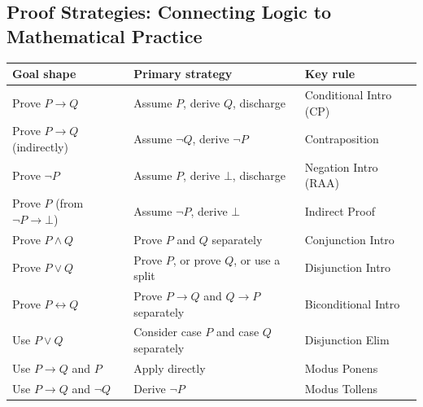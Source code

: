 
\subsection{Proof Strategies: Connecting Logic to Mathematical Practice}

\begin{tcolorbox}[colback=gray!6, colframe=gray!40, arc=2pt,
  left=6pt, right=6pt, top=4pt, bottom=4pt,
  title={\small\textbf{Proof Strategy Guide — Quick Reference}},
  fonttitle=\small\bfseries]
\small
\begin{tabular}{l l l}
\toprule
\textbf{Goal shape} & \textbf{Primary strategy} & \textbf{Key rule} \\
\midrule
Prove $P \to Q$              & Assume $P$, derive $Q$, discharge          & Conditional Intro (CP) \\
Prove $P \to Q$ (indirectly) & Assume $\neg Q$, derive $\neg P$           & Contraposition \\
Prove $\neg P$               & Assume $P$, derive $\bot$, discharge       & Negation Intro (RAA) \\
Prove $P$ (from $\neg P \to \bot$) & Assume $\neg P$, derive $\bot$         & Indirect Proof \\
Prove $P \wedge Q$           & Prove $P$ and $Q$ separately               & Conjunction Intro \\
Prove $P \vee Q$             & Prove $P$, or prove $Q$, or use a split    & Disjunction Intro \\
Prove $P \leftrightarrow Q$  & Prove $P \to Q$ and $Q \to P$ separately   & Biconditional Intro \\
Use $P \vee Q$               & Consider case $P$ and case $Q$ separately  & Disjunction Elim \\
Use $P \to Q$ and $P$        & Apply directly                             & Modus Ponens \\
Use $P \to Q$ and $\neg Q$   & Derive $\neg P$                            & Modus Tollens \\
\bottomrule
\end{tabular}
\end{tcolorbox}

\vspace{1em}

